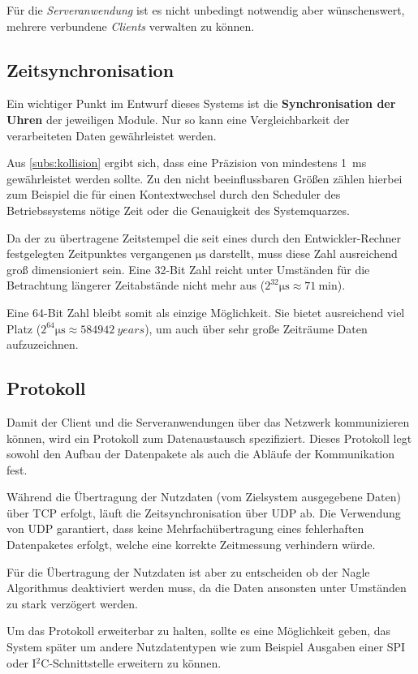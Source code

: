 Für die \emph{Serveranwendung} ist es nicht unbedingt notwendig aber
wünschenswert, mehrere verbundene \emph{Clients} verwalten zu können.
\subsection{Zeitsynchronisation}\label{subs:time}
Ein wichtiger Punkt im Entwurf dieses Systems ist die \textbf{Synchronisation
der Uhren} der jeweiligen Module. Nur so kann eine Vergleichbarkeit der
verarbeiteten Daten gewährleistet werden.

Aus \autoref{subs:kollision} ergibt sich, dass eine Präzision von mindestens
\SI{1}{\milli\second} gewährleistet werden sollte. Zu den nicht beeinflussbaren
Größen zählen hierbei zum Beispiel die für einen Kontextwechsel durch den
Scheduler des Betriebssystems nötige Zeit oder die Genauigkeit des
Systemquarzes.

Da der zu übertragene Zeitstempel die seit eines durch den Entwickler-Rechner
festgelegten Zeitpunktes vergangenen $\si{\micro\second}$ darstellt, muss diese
Zahl ausreichend groß dimensioniert sein. Eine 32-Bit Zahl reicht unter
Umständen für die Betrachtung längerer Zeitabstände nicht mehr aus
($2^{32}\si{\micro\second}\approx \SI{71}{\minute}$).

Eine 64-Bit Zahl bleibt somit als einzige Möglichkeit. Sie bietet ausreichend
viel Platz ($2^{64}\si{\micro\second}\approx 584942~years$), um auch
über sehr große Zeiträume Daten aufzuzeichnen.

\subsection{Protokoll}
Damit der Client und die Serveranwendungen über das Netzwerk kommunizieren
können, wird ein Protokoll zum Datenaustausch spezifiziert. Dieses Protokoll
legt sowohl den Aufbau der Datenpakete als auch die Abläufe der Kommunikation
fest.

Während die Übertragung der Nutzdaten (vom Zielsystem ausgegebene Daten) über
TCP erfolgt, läuft die Zeitsynchronisation über UDP ab. Die Verwendung von UDP
garantiert, dass keine Mehrfachübertragung eines fehlerhaften Datenpaketes
erfolgt, welche eine korrekte Zeitmessung verhindern würde.

Für die Übertragung der Nutzdaten ist aber zu entscheiden ob der Nagle
Algorithmus\cite{RFC896} deaktiviert werden muss, da die Daten ansonsten unter
Umständen zu stark verzögert werden.

Um das Protokoll erweiterbar zu halten, sollte es eine Möglichkeit geben, das
System später um andere Nutzdatentypen wie zum Beispiel Ausgaben einer SPI oder
I$^2$C-Schnittstelle erweitern zu können.

